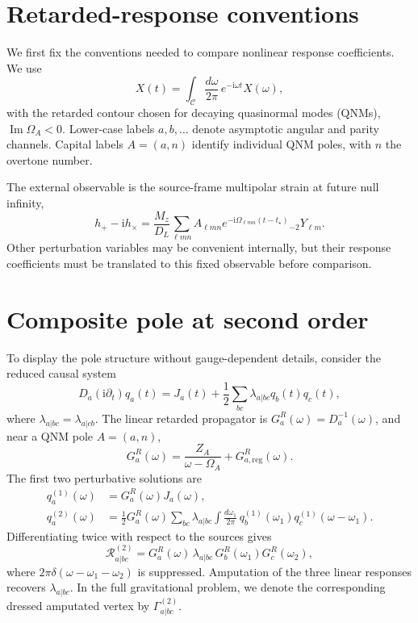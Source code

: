 \documentclass[
 reprint,
 amsmath,amssymb,
 aps,
 prl,
 superscriptaddress,
 nofootinbib
]{revtex4-2}
\newcommand{\Om}{\Omega}
\newcommand{\ii}{\mathrm{i}}
\begin{document}
\section{Retarded-response conventions}

We first fix the conventions needed to compare nonlinear response
coefficients. We use
\begin{equation}
X(t)=\int_{\mathcal C}\frac{d\omega}{2\pi}\,
e^{-\ii\omega t}X(\omega),
\label{eqS:fourier}
\end{equation}
with the retarded contour chosen for decaying quasinormal modes (QNMs),
\(\operatorname{Im}\Om_A<0\). Lower-case labels \(a,b,\ldots\) denote
asymptotic angular and parity channels. Capital labels \(A=(a,n)\) identify
individual QNM poles, with \(n\) the overtone number.

The external observable is the source-frame multipolar strain at future null
infinity,
\begin{equation}
h_+-\ii h_\times
=\frac{M_z}{D_L}
\sum_{\ell mn} A_{\ell mn}
e^{-\ii\Om_{\ell mn}(t-t_\star)}
{}_{-2}Y_{\ell m}.
\label{eqS:strain}
\end{equation}
Other perturbation variables may be convenient internally, but their response
coefficients must be translated to this fixed observable before comparison.

\section{Composite pole at second order}

To display the pole structure without gauge-dependent details, consider the
reduced causal system
\begin{equation}
D_a(\ii\partial_t)q_a(t)
=J_a(t)+\frac12\sum_{bc}
\lambda_{a|bc}q_b(t)q_c(t),
\label{eqS:model}
\end{equation}
where \(\lambda_{a|bc}=\lambda_{a|cb}\). The linear retarded propagator is
\(G_a^R(\omega)=D_a^{-1}(\omega)\), and near a QNM pole \(A=(a,n)\),
\begin{equation}
G_a^R(\omega)
=\frac{Z_A}{\omega-\Om_A}+G_{a,\mathrm{reg}}^R(\omega).
\label{eqS:pole}
\end{equation}
The first two perturbative solutions are
\begin{align}
q_a^{(1)}(\omega)
&=G_a^R(\omega)J_a(\omega),\\
q_a^{(2)}(\omega)
&=\frac12G_a^R(\omega)\sum_{bc}\lambda_{a|bc}
\int\frac{d\omega_1}{2\pi}\,
q_b^{(1)}(\omega_1)q_c^{(1)}(\omega-\omega_1).
\label{eqS:q2}
\end{align}
Differentiating twice with respect to the sources gives
\begin{equation}
\mathcal R^{(2)}_{a|bc}
=G_a^R(\omega)\,
\lambda_{a|bc}\,
G_b^R(\omega_1)G_c^R(\omega_2),
\label{eqS:R2}
\end{equation}
where \(2\pi\delta(\omega-\omega_1-\omega_2)\) is suppressed. Amputation of
the three linear responses recovers \(\lambda_{a|bc}\). In the full
gravitational problem, we denote the corresponding dressed amputated vertex by
\(\Gamma^{(2)}_{a|bc}\).
\end{document}
